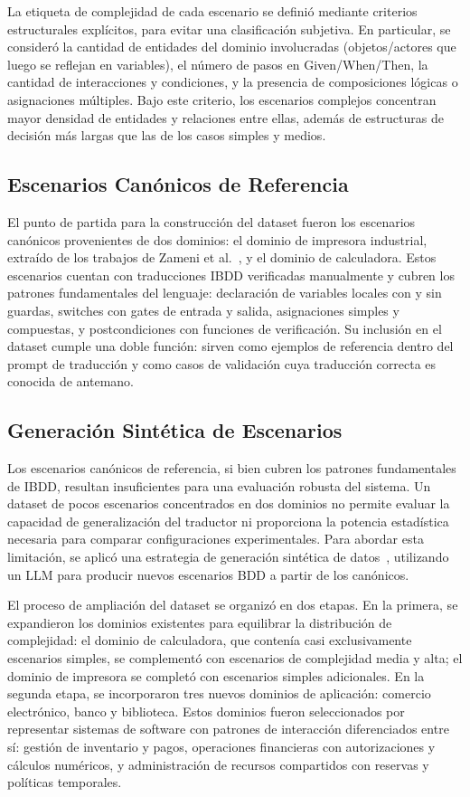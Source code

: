 La etiqueta de complejidad de cada escenario se definió mediante criterios estructurales explícitos, para evitar una clasificación subjetiva. En particular, se consideró la cantidad de entidades del dominio involucradas (objetos/actores que luego se reflejan en variables), el número de pasos en Given/When/Then, la cantidad de interacciones y condiciones, y la presencia de composiciones lógicas o asignaciones múltiples. Bajo este criterio, los escenarios complejos concentran mayor densidad de entidades y relaciones entre ellas, además de estructuras de decisión más largas que las de los casos simples y medios.

\subsection{Escenarios Canónicos de Referencia}

El punto de partida para la construcción del dataset fueron los escenarios canónicos provenientes de dos dominios: el dominio de impresora industrial, extraído de los trabajos de Zameni et al.~\cite{zameni2024ibdd}, y el dominio de calculadora. Estos escenarios cuentan con traducciones IBDD verificadas manualmente y cubren los patrones fundamentales del lenguaje: declaración de variables locales con y sin guardas, switches con gates de entrada y salida, asignaciones simples y compuestas, y postcondiciones con funciones de verificación. Su inclusión en el dataset cumple una doble función: sirven como ejemplos de referencia dentro del prompt de traducción y como casos de validación cuya traducción correcta es conocida de antemano.

\subsection{Generación Sintética de Escenarios}

Los escenarios canónicos de referencia, si bien cubren los patrones fundamentales de IBDD, resultan insuficientes para una evaluación robusta del sistema. Un dataset de pocos escenarios concentrados en dos dominios no permite evaluar la capacidad de generalización del traductor ni proporciona la potencia estadística necesaria para comparar configuraciones experimentales. Para abordar esta limitación, se aplicó una estrategia de generación sintética de datos~\cite{feng2021survey_augmentation}, utilizando un LLM para producir nuevos escenarios BDD a partir de los canónicos.

El proceso de ampliación del dataset se organizó en dos etapas. En la primera, se expandieron los dominios existentes para equilibrar la distribución de complejidad: el dominio de calculadora, que contenía casi exclusivamente escenarios simples, se complementó con escenarios de complejidad media y alta; el dominio de impresora se completó con escenarios simples adicionales. En la segunda etapa, se incorporaron tres nuevos dominios de aplicación: comercio electrónico, banco y biblioteca. Estos dominios fueron seleccionados por representar sistemas de software con patrones de interacción diferenciados entre sí: gestión de inventario y pagos, operaciones financieras con autorizaciones y cálculos numéricos, y administración de recursos compartidos con reservas y políticas temporales.

